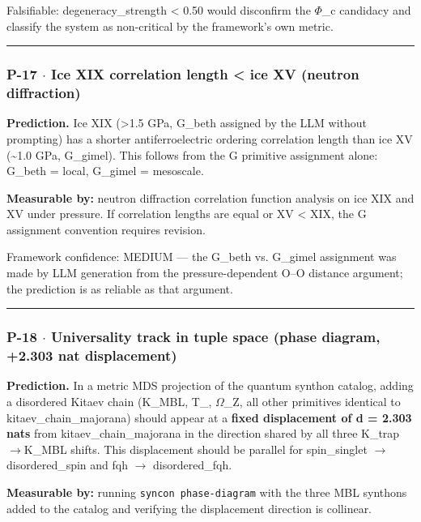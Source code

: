 \documentclass[12pt,a4paper]{article}
\begin{document}
Falsifiable: degeneracy\_strength \textless{} 0.50 would disconfirm the $\Phi$\_c candidacy and classify the system as non-critical by the framework's own metric.

\begin{center}
\rule{0.5\textwidth}{0.4pt}
\end{center}

\subsubsection{P-17 $\cdot$ Ice XIX correlation length \textless{} ice XV (neutron diffraction)}

\textbf{Prediction.} Ice XIX (\textgreater{}1.5 GPa, G\_beth assigned by the LLM without prompting) has a shorter antiferroelectric ordering correlation length than ice XV (\textasciitilde{}1.0 GPa, G\_gimel). This follows from the G primitive assignment alone: G\_beth = local, G\_gimel = mesoscale.

\textbf{Measurable by:} neutron diffraction correlation function analysis on ice XIX and XV under pressure. If correlation lengths are equal or XV \textless{} XIX, the G assignment convention requires revision.

Framework confidence: MEDIUM --- the G\_beth vs. G\_gimel assignment was made by LLM generation from the pressure-dependent O--O distance argument; the prediction is as reliable as that argument.

\begin{center}
\rule{0.5\textwidth}{0.4pt}
\end{center}

\subsubsection{P-18 $\cdot$ Universality track in tuple space (phase diagram, +2.303 nat displacement)}

\textbf{Prediction.} In a metric MDS projection of the quantum synthon catalog, adding a disordered Kitaev chain (K\_MBL, T\_\textbar{}, $\Omega$\_Z, all other primitives identical to kitaev\_chain\_majorana) should appear at a \textbf{fixed displacement of d = 2.303 nats} from kitaev\_chain\_majorana in the direction shared by all three K\_trap$\rightarrow$K\_MBL shifts. This displacement should be parallel for spin\_singlet $\rightarrow$ disordered\_spin and fqh $\rightarrow$ disordered\_fqh.

\textbf{Measurable by:} running \texttt{syncon phase-diagram} with the three MBL synthons added to the catalog and verifying the displacement direction is collinear.
\end{document}
